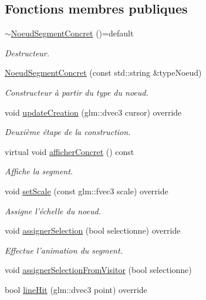 \subsection*{Fonctions membres publiques}
\begin{DoxyCompactItemize}
\item 
\hypertarget{class_noeud_segment_concret_aae4e7aa019149f71dd6573f57169043f}{\hyperlink{class_noeud_segment_concret_aae4e7aa019149f71dd6573f57169043f}{$\sim$\-Noeud\-Segment\-Concret} ()=default}\label{class_noeud_segment_concret_aae4e7aa019149f71dd6573f57169043f}

\begin{DoxyCompactList}\small\item\em Destructeur. \end{DoxyCompactList}\end{DoxyCompactItemize}
{\bf }\par
\begin{DoxyCompactItemize}
\item 
\hyperlink{class_noeud_segment_concret_a5fa9b4c7e916ecba1afdee2b92b782d0}{Noeud\-Segment\-Concret} (const std\-::string \&type\-Noeud)
\begin{DoxyCompactList}\small\item\em Constructeur à partir du type du noeud. \end{DoxyCompactList}\item 
void \hyperlink{class_noeud_segment_concret_aa2f857b1eb0eb798ffaaedb40da4082d}{update\-Creation} (glm\-::dvec3 cursor) override
\begin{DoxyCompactList}\small\item\em Deuxième étape de la construction. \end{DoxyCompactList}\item 
virtual void \hyperlink{class_noeud_segment_concret_a755c965f09fe2ca3d148812fda08b5d6}{afficher\-Concret} () const 
\begin{DoxyCompactList}\small\item\em Affiche la segment. \end{DoxyCompactList}\item 
void \hyperlink{class_noeud_segment_concret_a69e9e71a869b1502d24de74afa56bf55}{set\-Scale} (const glm\-::fvec3 scale) override
\begin{DoxyCompactList}\small\item\em Assigne l'échelle du noeud. \end{DoxyCompactList}\item 
void \hyperlink{class_noeud_segment_concret_a5ba94f3e7064c811b9f419db7cc4f0d0}{assigner\-Selection} (bool selectionne) override
\begin{DoxyCompactList}\small\item\em Effectue l'animation du segment. \end{DoxyCompactList}\item 
void \hyperlink{class_noeud_segment_concret_abbb904bbc64ac97425c8edb7813a5987}{assigner\-Selection\-From\-Visitor} (bool selectionne)
\item 
bool \hyperlink{class_noeud_segment_concret_aa2c3643bad5d9690bfd80357a2b174c2}{line\-Hit} (glm\-::dvec3 point) override
\end{DoxyCompactItemize}

